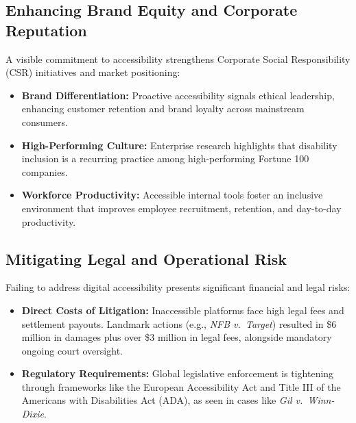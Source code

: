 \documentclass[11pt,a4paper]{article}
\begin{document}
	\subsection{Enhancing Brand Equity and Corporate Reputation}
	A visible commitment to accessibility strengthens Corporate Social
	Responsibility (CSR) initiatives and market positioning:
	\begin{itemize}
 	 \item \textbf{Brand Differentiation:} Proactive accessibility signals
        ethical leadership, enhancing customer retention and brand loyalty
        across mainstream consumers.
  	\item \textbf{High-Performing Culture:} Enterprise research highlights that
        disability inclusion is a recurring practice among high-performing
        Fortune 100 companies.
 	 \item \textbf{Workforce Productivity:} Accessible internal tools foster an
        inclusive environment that improves employee recruitment, retention,
        and day-to-day productivity.
	\end{itemize}

	\subsection{Mitigating Legal and Operational Risk}
	Failing to address digital accessibility presents significant financial and
	legal risks:
	
	\begin{itemize}
  	\item \textbf{Direct Costs of Litigation:} Inaccessible platforms face high
        legal fees and settlement payouts. Landmark actions (e.g., \emph{NFB
        v.\ Target}) resulted in \$6 million in damages plus over \$3 million
        in legal fees, alongside mandatory ongoing court oversight.
 	 \item \textbf{Regulatory Requirements:} Global legislative enforcement is
        tightening through frameworks like the European Accessibility Act and
        Title III of the Americans with Disabilities Act (ADA), as seen in
        cases like \emph{Gil v.\ Winn-Dixie}.
	\end{itemize}


\end{document}
